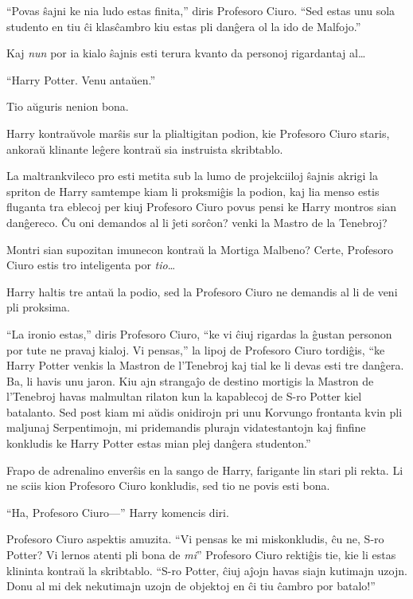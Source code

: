 ``Povas ŝajni ke nia ludo estas finita,'' diris Profesoro Ciuro. ``Sed
estas unu sola studento en tiu ĉi klasĉambro kiu estas pli danĝera ol
la ido de Malfojo.''

Kaj \emph{nun} por ia kialo ŝajnis esti terura kvanto da personoj
rigardantaj al\ldots

``Harry Potter. Venu antaŭen.''

Tio aŭguris nenion bona.

Harry kontraŭvole marŝis sur la plialtigitan podion, kie Profesoro
Ciuro staris, ankoraŭ klinante leĝere kontraŭ sia instruista
skribtablo.

La maltrankvileco pro esti metita sub la lumo de projekciiloj ŝajnis
akrigi la spriton de Harry samtempe kiam li proksmiĝis la podion, kaj
lia menso estis fluganta tra eblecoj per kiuj Profesoro Ciuro povus
pensi ke Harry montros sian danĝereco. Ĉu oni demandos al li ĵeti
sorĉon? venki la Mastro de la Tenebroj?

Montri sian supozitan imunecon kontraŭ la Mortiga Malbeno? Certe,
Profesoro Ciuro estis tro inteligenta por \emph{tio}\ldots

Harry haltis tre antaŭ la podio, sed la Profesoro Ciuro ne demandis al
li de veni pli proksima.

``La ironio estas,'' diris Profesoro Ciuro, ``ke vi ĉiuj rigardas la
ĝustan personon por tute ne pravaj kialoj. Vi pensas,'' la lipoj de
Profesoro Ciuro tordiĝis, ``ke Harry Potter venkis la Mastron de
l'Tenebroj kaj tial ke li devas esti tre danĝera. Ba, li havis unu
jaron. Kiu ajn strangaĵo de destino mortigis la Mastron de l'Tenebroj
havas malmultan rilaton kun la kapablecoj de S-ro Potter kiel
batalanto. Sed post kiam mi aŭdis onidirojn pri unu Korvungo frontanta
kvin pli maljunaj Serpentimojn, mi pridemandis plurajn vidatestantojn kaj
finfine konkludis ke Harry Potter estas mian plej danĝera studenton.''

Frapo de adrenalino enverŝis en la sango de Harry, farigante lin stari
pli rekta. Li ne sciis kion Profesoro Ciuro konkludis, sed tio ne
povis esti bona.

``Ha, Profesoro Ciuro—'' Harry komencis diri.

Profesoro Ciuro aspektis amuzita. ``Vi pensas ke mi miskonkludis, ĉu
ne, S-ro Potter? Vi lernos atenti pli bona de \emph{mi}'' Profesoro
Ciuro rektiĝis tie, kie li estas klininta kontraŭ la skribtablo. ``S-ro
Potter, ĉiuj aĵojn havas siajn kutimajn uzojn. Donu al mi dek
nekutimajn uzojn de objektoj en ĉi tiu ĉambro por batalo!''

